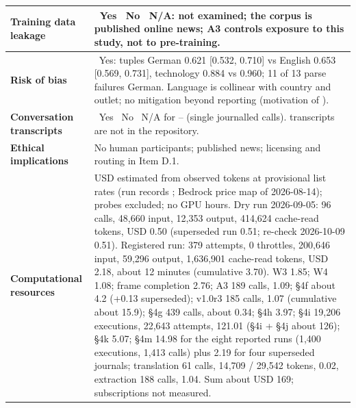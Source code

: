 \documentclass[12pt]{article}
\providecommand{\checked}{\ding{110}}   %
\providecommand{\unchecked}{\ding{111}} %
\begin{document}
{\begin{longtable}{|J|K|}
\\
\hline
\textbf{Training data leakage}
&
\unchecked~Yes \quad \checked~No \quad \unchecked~N/A: not examined; the corpus is published online news; A3 controls exposure to this study, not to pre-training.
\\
\hline
\textbf{Risk of bias}
&
\checked~Yes: tuples German 0.621 [0.532, 0.710] vs English 0.653 [0.569, 0.731], technology 0.884 vs 0.960; 11 of 13 parse failures German. Language is collinear with country and outlet; no mitigation beyond reporting (motivation of ).
\\
\hline
\textbf{Conversation transcripts}
&
\unchecked~Yes \quad \unchecked~No \quad \checked~N/A for -- (single journalled calls).  transcripts are not in the repository.
\\
\hline
\textbf{Ethical implications}
&
No human participants; published news; licensing and routing in Item D.1.
\\
\hline
\textbf{Computational resources}
&
USD estimated from observed tokens at provisional list rates (run records ; Bedrock price map of 2026-08-14); probes excluded; no GPU hours. Dry run 2026-09-05: 96 calls, 48{,}660 input, 12{,}353 output, 414{,}624 cache-read tokens, USD 0.50 (superseded run 0.51; re-check 2026-10-09 0.51). Registered run: 379 attempts, 0 throttles, 200{,}646 input, 59{,}296 output, 1{,}636{,}901 cache-read tokens, USD 2.18, about 12 minutes (cumulative 3.70). W3 1.85; W4 1.08; frame completion 2.76; A3 189 calls, 1.09; \S4f about 4.2 (+0.13 superseded); v1.0r3 185 calls, 1.07 (cumulative about 15.9); \S4g 439 calls, about 0.34; \S4h 3.97; \S4i 19{,}206 executions, 22{,}643 attempts, 121.01 (\S4i + \S4j about 126); \S4k 5.07; \S4m 14.98 for the eight reported runs (1{,}400 executions, 1{,}413 calls) plus 2.19 for four superseded journals;  translation 61 calls, 14{,}709 / 29{,}542 tokens, 0.02, extraction 188 calls, 1.04. Sum about USD 169;  subscriptions not measured.
\\
\hline
\end{longtable}
}

\ifdefined\inthesis\else
\noindent
{}
\fi
\end{document}

